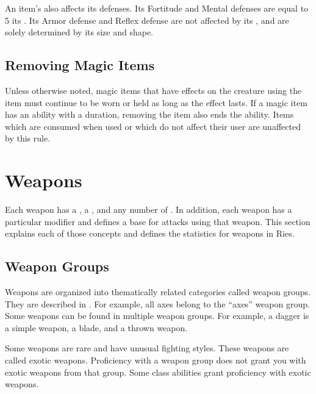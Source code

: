         An item's  also affects its defenses.
        Its Fortitude and Mental defenses are equal to 5 \add its .
        Its Armor defense and Reflex defense are not affected by its , and are solely determined by its size and shape.

    \subsection{Removing Magic Items}
        Unless otherwise noted, magic items that have effects on the creature using the item must continue to be worn or held as long as the effect lasts.
        If a magic item has an ability with a duration, removing the item also ends the ability.
        Items which are consumed when used or which do not affect their user are unaffected by this rule.

\newpage
\section{Weapons}\label{Weapons}

    Each weapon has a , a , and any number of .
    In addition, each weapon has a particular  modifier and defines a base  for attacks using that weapon.
    This section explains each of those concepts and defines the statistics for weapons in Ries.

    \subsection{Weapon Groups}\label{Weapon Groups}

        Weapons are organized into thematically related categories called weapon groups. They are described in . For example, all axes belong to the ``axes'' weapon group. Some weapons can be found in multiple weapon groups. For example, a dagger is a simple weapon, a blade, and a thrown weapon.

        \label{Exotic Weapons} Some weapons are rare and have unusual fighting styles.
        These weapons are called exotic weapons.
        Proficiency with a weapon group does not grant you with exotic weapons from that group.
        Some class abilities grant proficiency with exotic weapons.

